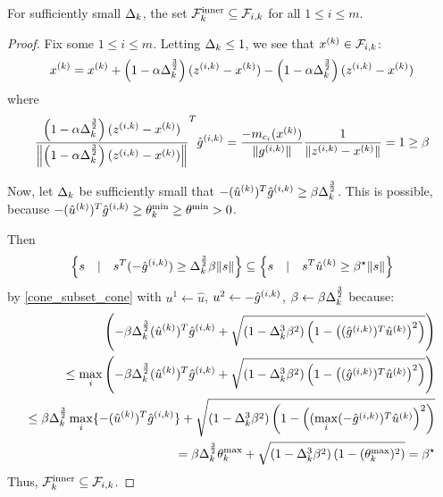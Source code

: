 \begin{theorem}
For sufficiently small $\Delta_k$, the set ${\mathcal {F}^{\text{inner}}_k} \subseteq {\mathcal F_{i, k}}$ for all $1\le i \le m$.
\end{theorem}


\begin{proof}
Fix some $1\le i \le m$.
Letting $\Delta_k \le 1$, we see that ${x^{(k)}} \in {\mathcal F_{i, k}}$:
\begin{align*}
{x^{(k)}} = {x^{(k)}} + \left(1 - \alpha\Delta_k^{\frac 3 2}\right)({z^{(i, k)}} - {x^{(k)}}) - \left(1 - \alpha\Delta_k^{\frac 3 2}\right)({z^{(i, k)}} - {x^{(k)}}) \\
\end{align*}
where
\begin{align*}
\frac{\left(1 - \alpha\Delta_k^{\frac 3 2}\right)({z^{(i, k)}} - {x^{(k)}})}{\left\|\left(1 - \alpha\Delta_k^{\frac 3 2}\right)({z^{(i, k)}} - {x^{(k)}})\right\|}^T{{\hat g}^{(i, k)}} =\frac{-m_{c_i}({x^{(k)}})}{\|{g^{(i, k)}}\|}\frac{1}{\|{z^{(i, k)}} - {x^{(k)}}\|} = 1 \ge \beta\\
\end{align*}


Now, let $\Delta_k$ be sufficiently small that $-({{\hat u}^{(k)}})^T{{\hat g}^{(i, k)}} \ge \beta\Delta_k^{\frac 3 2}$.
This is possible, because $ -({{\hat u}^{(k)}})^T{{\hat g}^{(i, k)}} \ge \theta^{\text{min}}_k \ge \theta^{\text{min}} > 0$.

Then
\begin{align*}
\left\{s\quad | \quad s^T(-{{\hat g}^{(i, k)}})\ge\Delta_k^{\frac 3 2}\beta\|s\| \right\}  \subseteq \left\{s\quad | \quad s^T{{\hat u}^{(k)}}\ge\beta^{\star}\|s\| \right\}
\end{align*}
by \cref{cone_subset_cone} with $u^1 \gets \hat u$, $u^2 \gets -{{\hat g}^{(i, k)}}$, $\beta \gets \beta \Delta_k^{\frac 3 2 }$ because:
\begin{align*}
\left(-\beta\Delta_k^{\frac 3 2}({{\hat u}^{(k)}})^T{{\hat g}^{(i, k)}} + \sqrt{(1 - \Delta_k^3\beta^2)\left(1 - \left(({{\hat g}^{(i, k)}})^T\hat u^{(k)}\right)^2\right)}\right) \\
\le \max_i \left(-\beta\Delta_k^{\frac 3 2}({{\hat u}^{(k)}})^T{{{\hat g}^{(i, k)}}} + \sqrt{(1 - \Delta_k^3\beta^2)\left(1 - \left(({{\hat g}^{(i, k)}})^T{{\hat u}^{(k)}}\right)^2\right)}\right) \\
\le \beta\Delta_k^{\frac 3 2} \max_i\{-({{\hat u}^{(k)}})^T{{\hat g}^{(i, k)}}\} + \sqrt{(1 - \Delta_k^3\beta^2)\left(1 - \left((\max_i(-{{\hat g}^{(i, k)}})^T{{\hat u}^{(k)}}\right)^2\right)} \\
= \beta\Delta_k^{\frac 3 2} \theta^{\text{max}}_k + \sqrt{(1 - \Delta_k^3\beta^2)\left(1 - (\theta^{\text{max}}_k) ^2\right)} = \beta^{\star}
\end{align*}
Thus, ${\mathcal {F}^{\text{inner}}_k} \subseteq {\mathcal F_{i, k}}$.
\end{proof}

